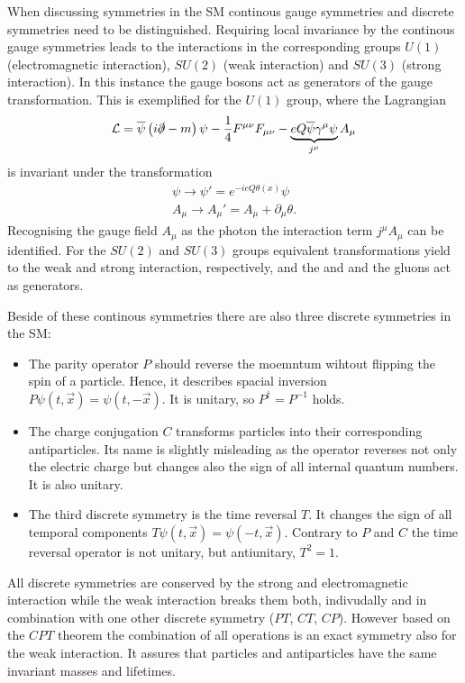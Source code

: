 When discussing symmetries in the \ac{SM} continous gauge symmetries and discrete symmetries need to be distinguished. Requiring
local invariance by the continous gauge symmetries leads to the interactions in the corresponding groups $U(1)$ (electromagnetic
interaction), $SU(2)$ (weak interaction) and $SU(3)$ (strong interaction). In this instance the gauge bosons act as generators
of the gauge transformation. This is exemplified for the $U(1)$ group, where the Lagrangian
\begin{equation}
\mathcal{L}=\overline{\psi}\left(i\slashed{\partial} - m\right)\psi
- \frac{1}{4}F^{\mu\nu}F_{\mu\nu} - \underbrace{eQ\overline{\psi}\gamma^{\mu}\psi}_{j^{\mu}}A_{\mu}
\end{equation}
is invariant under the transformation
\begin{align}
\psi\rightarrow\psi'=e^{-ieQ\theta\left(x\right)}\psi\\
A_\mu\rightarrow A_\mu'=A_\mu+\partial_\mu\theta.
\end{align}
Recognising the gauge field $A_\mu$ as the photon the interaction term $j^\mu A_\mu$ can be identified. For the $SU(2)$ and $SU(3)$
groups equivalent transformations yield to the weak and strong interaction, respectively, and the \Wpm and \Z and the gluons act as
generators.

Beside of these continous symmetries there are also three discrete symmetries in the \ac{SM}:
\begin{itemize}
	\item The parity operator $P$ should reverse the moemntum wihtout flipping the spin of a particle. Hence, it describes spacial
		inversion $P\psi\left(t,\vec{x}\right) = \psi\left(t,-\vec{x}\right)$. It is unitary, so $P^{\dagger}=P^{-1}$ holds.
	\item The charge conjugation $C$ transforms particles into their corresponding antiparticles. Its name is slightly misleading
		as the operator reverses not only the electric charge but changes also the sign of all internal quantum numbers. It is also
		unitary.
	\item The third discrete symmetry is the time reversal $T$. It changes the sign of all temporal components
		$T\psi\left(t,\vec{x}\right) = \psi\left(-t,\vec{x}\right)$. Contrary to $P$ and $C$ the time reversal operator is not unitary,
		but antiunitary, \ie $T^2=1$.
\end{itemize}
All discrete symmetries are conserved by the strong and electromagnetic interaction while the weak interaction breaks them both,
indivudally and in combination with one other discrete symmetry ($PT$, $CT$, $CP$). However based on the $CPT$ theorem the combination
of all operations is an exact symmetry also for the weak interaction. It assures that particles and antiparticles have the same
invariant masses and lifetimes.

